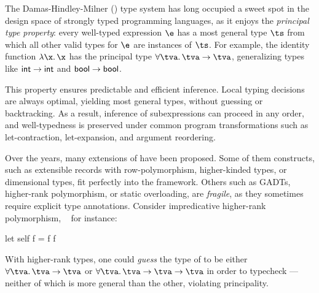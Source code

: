 \documentclass[acmsmall,screen,nonacm]{acmart}
\begin{document}

The Damas-Hindley-Milner (\HM) \cite{Damas-Milner/W@popl82} type system has
long occupied a sweet spot in the design space of strongly typed programming
languages, as it enjoys the \emph{principal type property}: every well-typed
expression $\e$ has a most general type $\ts$ from which all other valid
types for $\e$ are instances of $\ts$. For example, the identity function
$\efun \x \x$ has the principal type $\tfor \tv \tv \to \tv$, generalizing
types like $\mathsf{int} \to \mathsf{int}$ and $\mathsf{bool} \to \mathsf{bool}$.


This property ensures predictable and efficient inference. Local typing
decisions are always optimal, yielding most general types, without guessing or
backtracking. As a result, inference of subexpressions can proceed in any
order, and well-typedness is preserved under common program transformations
such as let-contraction, let-expansion, and argument reordering.


Over the years, many extensions of \ML have been proposed. Some of them
constructs, such as extensible records with row-polymorphism, higher-kinded
types, or dimensional types, fit perfectly into the \ML framework. Others such
as GADTs, higher-rank polymorphism, or static overloading, are
\emph{fragile}, as they sometimes require explicit type
annotations.
%
Consider impredicative higher-rank polymorphism,
\MLF~\cite{LeBotlan-Remy/recasting-mlf} for instance:
\begin{program}[input]
  let self f = f f
\end{program}
With higher-rank types, one could \emph{guess} the type of  to be
either $\tfor \tv \tv \to \tv$ or $\tfor \tv \tv \to \tv \to \tv$ in order
to typecheck ---neither of which is more general than the other,
violating principality.

\end{document}
